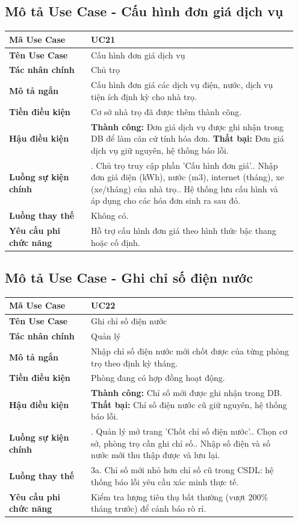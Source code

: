 \documentclass[a4paper,oneside]{report}
\begin{document}
\subsection{Mô tả Use Case - Cấu hình đơn giá dịch vụ}

\begin{longtable}[]{@{}>{\RaggedRight\arraybackslash}p{0.27\linewidth}>{\RaggedRight\arraybackslash}p{0.68\linewidth}@{}}
\toprule
\textbf{Mã Use Case} & UC21\tabularnewline
\midrule
\endhead
\textbf{Tên Use Case} & Cấu hình đơn giá dịch vụ\tabularnewline
\textbf{Tác nhân chính} & Chủ trọ\tabularnewline
\textbf{Mô tả ngắn} & Cấu hình đơn giá các dịch vụ điện, nước, dịch vụ
tiện ích định kỳ cho nhà trọ.\tabularnewline
\textbf{Tiền điều kiện} & Cơ sở nhà trọ đã được thêm thành
công.\tabularnewline
\textbf{Hậu điều kiện} & \textbf{Thành công:} Đơn giá dịch vụ được ghi nhận trong DB để làm căn cứ tính hóa đơn.\newline 
\textbf{Thất bại:} Đơn giá dịch vụ giữ nguyên, hệ thống báo lỗi.\tabularnewline
\textbf{Luồng sự kiện chính} & 1. Chủ trọ truy cập
phần 'Cấu hình đơn giá'.\newline 2. Nhập đơn giá điện (kWh), nước
(m3), internet (tháng), xe (xe/tháng) của nhà trọ.\newline 3. Hệ
thống lưu cấu hình và áp dụng cho các hóa đơn sinh ra sau
đó.\tabularnewline
\textbf{Luồng thay thế} & Không có.\tabularnewline
\textbf{Yêu cầu phi chức năng} & Hỗ trợ cấu hình đơn giá theo hình thức
bậc thang hoặc cố định.\tabularnewline
\bottomrule
\end{longtable}

\subsection{Mô tả Use Case - Ghi chỉ số điện nước}

\begin{longtable}[]{@{}>{\RaggedRight\arraybackslash}p{0.27\linewidth}>{\RaggedRight\arraybackslash}p{0.68\linewidth}@{}}
\toprule
\textbf{Mã Use Case} & UC22\tabularnewline
\midrule
\endhead
\textbf{Tên Use Case} & Ghi chỉ số điện nước\tabularnewline
\textbf{Tác nhân chính} & Quản lý\tabularnewline
\textbf{Mô tả ngắn} & Nhập chỉ số điện nước mới chốt được của từng phòng
trọ theo định kỳ tháng.\tabularnewline
\textbf{Tiền điều kiện} & Phòng đang có hợp đồng hoạt
động.\tabularnewline
\textbf{Hậu điều kiện} & \textbf{Thành công:} Chỉ số mới được ghi nhận trong DB.\newline 
\textbf{Thất bại:} Chỉ số điện nước cũ giữ nguyên, hệ thống báo lỗi.\tabularnewline
\textbf{Luồng sự kiện chính} & 1. Quản lý mở trang
'Chốt chỉ số điện nước'.\newline 2. Chọn cơ sở, phòng trọ cần ghi
chỉ số.\newline 3. Nhập số điện và số nước mới thu thập được và lưu
lại.\tabularnewline
\textbf{Luồng thay thế} & 3a. Chỉ số mới nhỏ hơn chỉ số cũ trong CSDL:
hệ thống báo lỗi yêu cầu xác minh thực tế.\tabularnewline
\textbf{Yêu cầu phi chức năng} & Kiểm tra lượng tiêu thụ bất thường
(vượt 200\% tháng trước) để cảnh báo rò rỉ.\tabularnewline
\bottomrule
\end{longtable}
\end{document}
